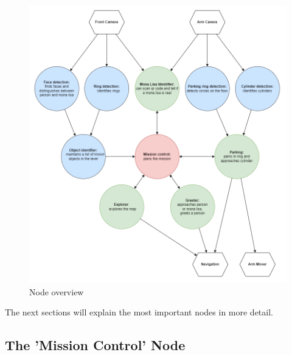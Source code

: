 \documentclass[a4paper,
  twoside, %
  headlines=2.1 %
  ]{scrartcl}
\begin{document}
\begin{figure}[H]
  \centering
  \includegraphics[scale=1.0]{node_overview.png}
  \caption{Node overview}   
\end{figure}

The next sections will explain the most important nodes in more detail.\\

\subsection{The 'Mission Control' Node}
\end{document}
